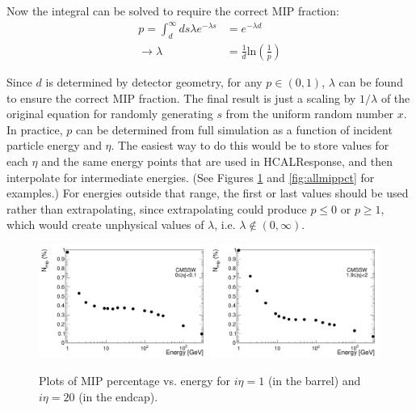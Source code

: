 Now the integral can be solved to require the correct MIP fraction:
\begin{align}
p = \int_{d}^{\infty} ds \lambda e^{-\lambda s} &= e^{-\lambda d}\\
\rightarrow \lambda &= \frac{1}{d}\text{ln}\left(\frac{1}{p}\right)
\end{align}

Since $d$ is determined by detector geometry, for any $p \in (0,1)$, $\lambda$ can be found to ensure the correct MIP fraction. The final result is just a scaling by $1/\lambda$ of the original equation for randomly generating $s$ from the uniform random number $x$. In practice, $p$ can be determined from full simulation as a function of incident particle energy and $\eta$. The easiest way to do this would be to store values for each $\eta$ and the same energy points that are used in HCALResponse, and then interpolate for intermediate energies. (See Figures \ref{fig:mippct} and \ref{fig:allmippct} for examples.) For energies outside that range, the first or last values should be used rather than extrapolating, since extrapolating could produce $p \leq 0$ or $p \geq 1$, which would create unphysical values of $\lambda$, i.e. $\lambda \not\in (0,\infty)$.

\begin{figure}[hbtp]
\begin{center}
\includegraphics[width=0.49\textwidth]{figures/fs_plot_mip_ieta1.pdf}
\includegraphics[width=0.49\textwidth]{figures/fs_plot_mip_ieta20.pdf}
\caption{Plots of MIP percentage vs. energy for $i\eta = 1$ (in the barrel) and $i\eta = 20$ (in the endcap).}
\label{fig:mippct}
\end{center}
\end{figure}

